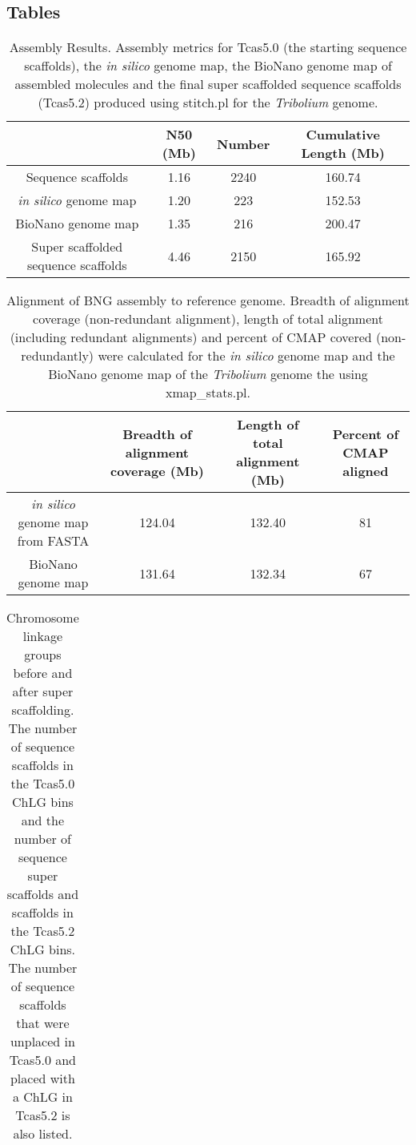 \documentclass{bmcart}
\begin{document}
\begin{backmatter}
\section*{Tables}
\begin{table}[h!]
	\caption{Assembly Results. Assembly metrics for Tcas5.0 (the starting sequence scaffolds), the \textit{in silico} genome map, the BioNano genome map of assembled molecules and the final super scaffolded sequence scaffolds (Tcas5.2) produced using stitch.pl for the \textit{Tribolium} genome.}
	\begin{tabular}{cccc}
		\hline
		& N50 (Mb)  & Number & Cumulative Length (Mb)\\ \hline
		Sequence scaffolds & 1.16 & 2240 & 160.74\\
		\textit{in silico} genome map & 1.20 &  223 & 152.53\\
		BioNano genome map & 1.35 &  216 & 200.47\\
		Super scaffolded sequence scaffolds & 4.46 & 2150 & 165.92\\ \hline
	\end{tabular}
\end{table}
\begin{table}[h!]
\caption{Alignment of BNG assembly to reference genome. Breadth of alignment coverage (non-redundant alignment), length of total alignment (including redundant alignments) and percent of CMAP covered (non-redundantly) were calculated for the \textit{in silico} genome map and the BioNano genome map of the \textit{Tribolium} genome the using xmap\_stats.pl.}
      \begin{tabular}{cccc}
        \hline
           & Breadth of alignment coverage (Mb) & Length of total alignment (Mb) & Percent of CMAP aligned \\ \hline
        \textit{in silico} genome map from FASTA & 124.04 & 132.40 & 81 \\
        BioNano genome map & 131.64 & 132.34 & 67 \\ \hline
      \end{tabular}
\end{table}
\begin{table}[h!]
	\caption{Chromosome linkage groups before and after super scaffolding. The number of sequence scaffolds in the Tcas5.0 ChLG bins and the number of sequence super scaffolds and scaffolds in the Tcas5.2 ChLG bins. The number of sequence scaffolds  that were unplaced in Tcas5.0 and placed with a ChLG in Tcas5.2 is also listed. }
	\begin{tabular}{cccc}

\end{tabular}
\end{table}
\end{backmatter}
\end{document}
